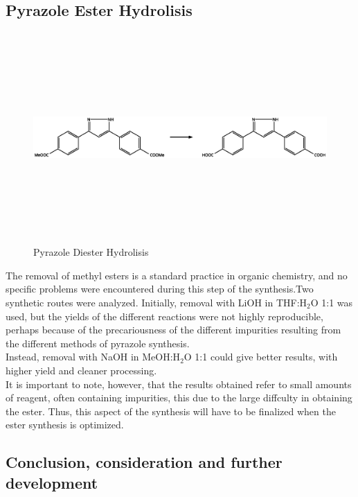 \documentclass[../Master.tex]{subfiles}
\begin{document}
\subsection{Pyrazole Ester Hydrolisis}\label{sec:pyrazole-hydro}

\begin{figure}[h!]
	\centering
	\includegraphics[width=13cm,height=8cm,keepaspectratio]{Structures/pyrazole-hydro.eps}
	\caption{Pyrazole Diester Hydrolisis}\label{fig:pyrazole-form}
\end{figure}

The removal of methyl esters is a standard practice in organic chemistry, and no specific problems were encountered during this step of the synthesis.Two synthetic routes were analyzed.
Initially, removal with LiOH in THF:H$_2$O 1:1 was used, but the yields of the different reactions were not highly reproducible, perhaps because of the precariousness of the different impurities resulting from the different methods of pyrazole synthesis. \\
Instead, removal with NaOH in MeOH:H$_{2}$O 1:1 could give better results, with higher yield and cleaner processing. \\
It is important to note, however, that the results obtained refer to small amounts of reagent, often containing impurities, this due to the large diffculty in obtaining the ester. Thus, this aspect of the synthesis will have to be finalized when the ester synthesis is optimized.





\subsection{Conclusion, consideration and further development}\label{sec:conclusioni}
\end{document}
